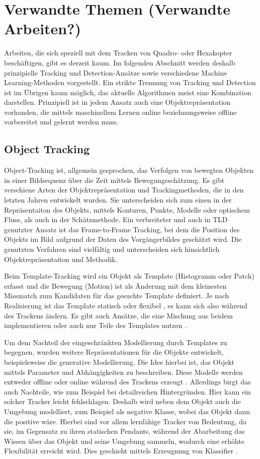\section {Verwandte Themen (Verwandte Arbeiten?) }
Arbeiten, die sich speziell mit dem Tracken von Quadro- oder Hexakopter beschäftigen, gibt es derzeit kaum. Im folgenden Abschnitt werden deshalb prinzipielle Tracking und Detection-Ansätze sowie verschiedene Machine Learning-Methoden vorgestellt. Ein strikte Trennung von Tracking und Detection ist im Übrigen kaum möglich, das aktuelle Algorithmen meist eine Kombination darstellen. Prinzipiell ist in jedem Ansatz auch eine Objektrepräsentation vorhanden, die mittels maschinellem Lernen online beziehnungsweise offline vorbereitet und gelernt werden muss.

\subsection{Object Tracking}
Object-Tracking ist, allgemein gesprochen, das Verfolgen von bewegten Objekten in einer Bildsequenz über die Zeit mittels Bewegungsschätzung. Es gibt verschiene Arten der Objektrepräsentation und Trackingmethoden, die in den letzten Jahren entwickelt wurden. Sie unterscheiden sich zum einen in der Repräsentaiton des Objekts, mittels Konturen, Punkte, Modelle oder optischem Fluss, als auch in der Schätzmethode. Ein verbreiteter und auch in TLD genutzter Ansatz ist das Frame-to-Frame Tracking, bei dem die Position des Objekts im Bild aufgrund der Daten des Vorgängerbildes geschätzt wird. Die genutzten Verfahren sind vielfältig und unterscheiden sich hinsichtlich Objektrepräsentaiton und Methodik.

Beim Template-Tracking \cite{OPT}\cite{GFT}\cite{KBT} wird ein Objekt als Template (Histogramm oder Patch) erfasst und die Bewegung (Motion) ist als Änderung mit dem kleinesten Missmatch zum Kandidaten für das gesuchte Template definiert. Je nach Realisierung ist das Template statisch\cite{KBT} oder flexibel \cite{OPT}\cite{GFT}, es kann sich also während des Trackens ändern. Es gibt auch Ansätze, die eine Mischung aus beidem implementieren \cite{TUP}\cite{SMAT}\cite{RDT} oder auch nur Teile des Templates nutzen \cite{ROAM}\cite{RFT}.

Um dem Nachteil der eingeschränkten Modellierung durch Templates zu begegnen, wurden weitere Repräsentationen für die Objekte entwickelt, beispielsweise die generative Modellierung. Die Idee hierbei ist, das Objekt mittels Parameter und Abhängigkeiten zu beschreiben. Diese Modelle werden entweder offline \cite{ETR} oder online während des Trackens erzeugt \cite{RFT}\cite{VTD}. Allerdings birgt das auch Nachteile, wie zum Beispiel bei detailreichen Hintergründen. Hier kann ein solcher Tracker leicht fehlschlagen. Deshalb wird neben dem Objekt auch die Umgebung modelliert, zum Beispiel als negative Klasse, wobei das Objekt dann die positive wäre. Hierbei sind vor allem lernfähige Tracker von Bedeutung, da sie, im Gegensatz zu ihren statischen Pendants, während der Abarbeitung das Wissen über das Objekt und seine Umgebung sammeln, wodurch eine erhöhte Flexibilität erreicht wird. Dies geschieht mittels Erzeugnung von Klassifier \cite{ONS}\cite{ENT}\cite{OBT}. 

